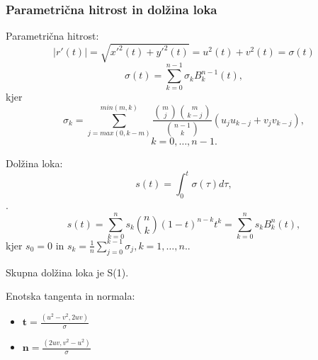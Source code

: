 \documentclass[12pt]{beamer}
\theoremstyle{definition} %
\theoremstyle{plain} %
\begin{document}
\begin{frame}
\frametitle{Parametrična hitrost in dolžina loka}
Parametrična hitrost:
$$ | r\prime (t) | =\sqrt{x\prime^2(t)+y\prime^2(t)}= u^2 (t) + v^2 (t) = \sigma (t)$$
$$\sigma (t) =\sum_{k=0}^{n-1} \sigma_kB_k^{n-1}(t),$$
	kjer  
$$\sigma_k =\sum_{j=max(0,k-m)}^{min(m,k)}\frac{\binom{m}{j}\binom{m}{k-j}}{\binom{n-1}{k}}(u_ju_{k-j}+v_jv_{k-j}),$$ $$k = 0,\ldots , n - 1.$$
\end{frame}
\begin{frame}
    Dolžina loka:
    $$s (t) =\int^t_0\sigma(\tau) d\tau,$$.
    $$s (t) =\sum^n_{k=0}s_k\binom{n}{k}(1-t)^{n-k}t^k=\sum_{k=0}^n s_kB^n_k(t),$$
	kjer  $s_0=0$ in $s_k=\frac{1}{n}\sum^{k-1}_{j=0}\sigma_j, k=1,\ldots,n.$.

    Skupna dolžina loka je S(1). 
    \newline
    
    Enotska tangenta in normala:
\begin{itemize}
    \item $\textbf{t} =\frac{(u^2 - v^2, 2uv)}{\sigma}$
    \item $\textbf{n} =\frac{(2uv, v^2 - u^2)}{\sigma}$
\end{itemize}
\end{frame}
	
\end{document}
